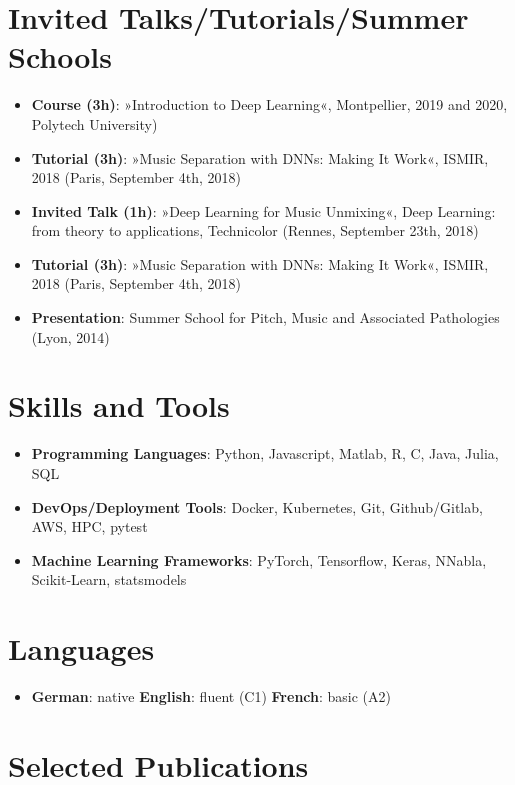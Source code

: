 \documentclass[a4paper,11pt]{article}
\newcommand{\resumeItem}[2]{
  \item\small{
    \textbf{#1}{: #2 \vspace{-2pt}}
  }
}
\newcommand{\resumeSubItem}[2]{\resumeItem{#1}{#2}\vspace{-4pt}}
\newcommand{\resumeSubHeadingListStart}{\begin{itemize}[leftmargin=*]}
\newcommand{\resumeSubHeadingListEnd}{\end{itemize}}
\begin{document}
\section{Invited Talks/Tutorials/Summer
Schools}
  \resumeSubHeadingListStart
    \resumeSubItem{Course (3h)}
    {»Introduction to Deep Learning«, Montpellier, 2019 and 2020, Polytech University)}
    \resumeSubItem{Tutorial (3h)}
    {»Music Separation with DNNs: Making It Work«, ISMIR, 2018 (Paris, September 4th, 2018)}
    \resumeSubItem{Invited Talk (1h)}
    {»Deep Learning for Music Unmixing«, Deep Learning: from
      theory to applications, Technicolor (Rennes, September 23th, 2018)}
    \resumeSubItem{Tutorial (3h)}
    {»Music Separation with DNNs: Making It Work«, ISMIR, 2018 (Paris, September 4th, 2018)}
    \resumeSubItem{Presentation}
    {Summer School for Pitch, Music and Associated Pathologies (Lyon, 2014)}
  \resumeSubHeadingListEnd


\section{Skills and Tools}
 \resumeSubHeadingListStart
   \resumeSubItem{Programming Languages}
     {Python, Javascript, Matlab, R, C, Java, Julia, SQL}
   \resumeSubItem{DevOps/Deployment Tools}
     {Docker, Kubernetes, Git, Github/Gitlab, AWS, HPC, pytest}
   \resumeSubItem{Machine Learning Frameworks}
     {PyTorch, Tensorflow, Keras, NNabla, Scikit-Learn, statsmodels}
     \resumeSubHeadingListEnd

\section{Languages}
\resumeSubHeadingListStart
  \item{
    \textbf{German}{: native}
    \textbf{English}{: fluent (C1)}
    \textbf{French}{: basic (A2)}
  }
\resumeSubHeadingListEnd

\section{Selected Publications}
\end{document}
